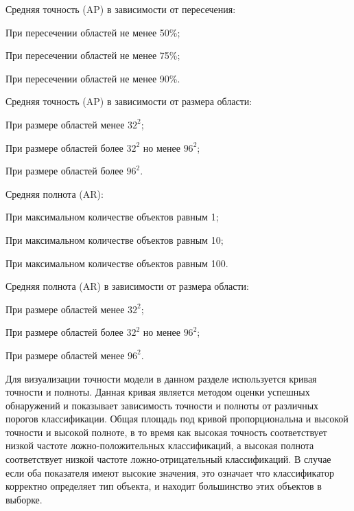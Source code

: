 %
\begin{itemize*}
  \item Средняя точность (AP) в зависимости от пересечения:
	\begin{itemize*}
	  \item При пересечении областей не менее 50\%;
	  \item При пересечении областей не менее 75\%;
	  \item При пересечении областей не менее 90\%.	  
	\end{itemize*}
  \item Средняя точность (AP) в зависимости от размера области:
	\begin{itemize*}
	  \item При размере областей менее \(32^2\);
	  \item При размере областей более \(32^2\) но менее \(96^2\);
	  \item При размере областей более \(96^2\).
	\end{itemize*}
  \item Средняя полнота (AR):
	\begin{itemize*}
	  \item При максимальном количестве объектов равным 1;
	  \item При максимальном количестве объектов равным 10;
	  \item При максимальном количестве объектов равным 100.
	\end{itemize*}
  \item Средняя полнота (AR) в зависимости от размера области:
	\begin{itemize*}
	  \item При размере областей менее \(32^2\);
	  \item При размере областей более \(32^2\) но менее \(96^2\);
	  \item При размере областей менее \(96^2\).
	\end{itemize*}
\end{itemize*}
%

Для визуализации точности модели в данном разделе используется кривая точности и полноты. Данная кривая является методом оценки успешных обнаружений и показывает зависимость точности и полноты от различных порогов классификации. Общая площадь под кривой пропорциональна и высокой точности и высокой полноте, в то время как высокая точность соответствует низкой частоте ложно-положительных классификаций, а высокая полнота соответствует низкой частоте ложно-отрицательный классификаций. В случае если оба показателя имеют высокие значения, это означает что классификатор корректно определяет тип объекта, и находит большинство этих объектов в выборке.

